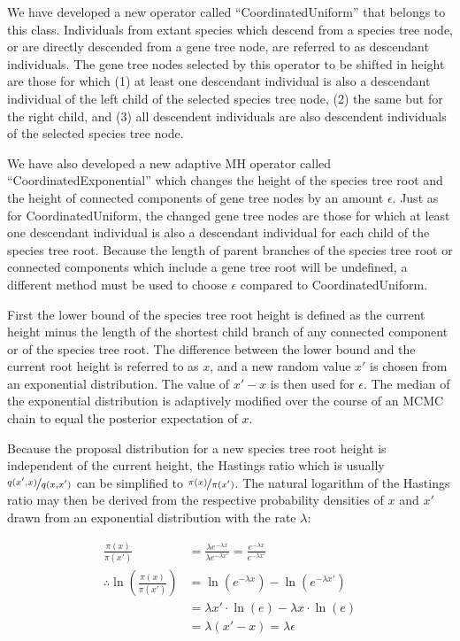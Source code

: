 \documentclass[12pt]{article}
\begin{document}
We have developed a new operator called ``CoordinatedUniform'' that belongs to
this class. Individuals from extant species which descend from a species tree
node, or are directly descended from a gene tree node, are referred to as
descendant individuals. The gene tree nodes selected by this operator to be shifted in height are those
for which (1) at least one descendant individual is also a descendant individual
of the left child of the selected species tree node, (2) the same but for the right child, and (3) all descendent
individuals are also descendent individuals of the selected species tree node.

We have also developed a new adaptive MH \citep{Andrieu2008} operator called
``CoordinatedExponential'' which changes the height of the species tree root and
the height of connected components of gene tree nodes by an amount $\epsilon$.
Just as for CoordinatedUniform, the changed gene tree nodes are those for which at least one descendant individual
is also a descendant individual for each child of the species tree root.
Because the length of parent branches of the species tree root or connected
components which include a gene tree root will be undefined, a different method must be used to choose
$\epsilon$ compared to CoordinatedUniform.

First the lower bound of the species tree root height is defined as the current
height minus the length of the shortest child branch of any connected component or
of the species tree root. The difference between the lower bound and the current
root height is referred to as $x$, and a new random value $x'$ is chosen from an
exponential distribution. The value of $x' - x$ is then used for $\epsilon$. The
median of the exponential distribution is adaptively modified over the course of
an MCMC chain to equal the posterior expectation of $x$.

Because the proposal distribution for a new species tree root height is
independent of the current height, the Hastings ratio which is usually
$\nicefrac{q(x',x)}{q(x,x')}$ \citep{Hastings1970} can be simplified to
$\nicefrac{\pi(x)}{\pi(x')}$. The natural logarithm of the Hastings ratio may then
be derived from the respective probability densities of $x$ and
$x'$ drawn from an exponential distribution with the rate $\lambda$:

\begin{align}
\frac{\pi(x)}{\pi(x')} &= \frac{\lambda e^{-\lambda x}}{\lambda e^{-\lambda x'}} = \frac{e^{-\lambda x}}{e^{-\lambda x'}}\\
\therefore \ln\left(\frac{\pi(x)}{\pi(x')}\right) &= \ln \left(e^{-\lambda x}\right) - \ln \left(e^{-\lambda x'}\right)\\
& = \lambda x' \cdot \ln \left(e\right) - \lambda x \cdot \ln \left(e\right)\\
& = \lambda \left(x' - x\right) = \lambda \epsilon
\end{align}
\end{document}

